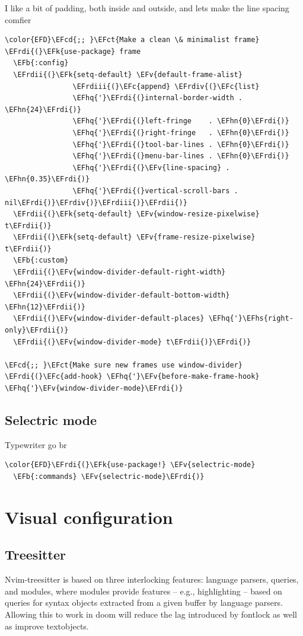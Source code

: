 \documentclass{scrartcl}
\newcommand{\EFk}[1]{\textcolor{EFk}{#1}} %
\newcommand{\EFb}[1]{\textcolor{EFb}{#1}} %
\newcommand{\EFct}[1]{\textcolor{EFct}{#1}} %
\newcommand{\EFc}[1]{\textcolor{EFc}{#1}} %
\newcommand{\EFv}[1]{\textcolor{EFv}{#1}} %
\newcommand{\EFcd}[1]{\textcolor{EFcd}{#1}} %
\newcommand{\EFhn}[1]{#1} %
\newcommand{\EFhq}[1]{#1} %
\newcommand{\EFhs}[1]{#1} %
\newcommand{\EFrdi}[1]{#1} %
\newcommand{\EFrdii}[1]{#1} %
\newcommand{\EFrdiii}[1]{#1} %
\newcommand{\EFrdiv}[1]{#1} %
\begin{document}
I like a bit of padding, both inside and outside, and lets make the line spacing comfier
\begin{Code}
\begin{Verbatim}[]
\color{EFD}\EFcd{;; }\EFct{Make a clean \& minimalist frame}
\EFrdi{(}\EFk{use-package} frame
  \EFb{:config}
  \EFrdii{(}\EFk{setq-default} \EFv{default-frame-alist}
                \EFrdiii{(}\EFc{append} \EFrdiv{(}\EFc{list}
                \EFhq{'}\EFrdi{(}internal-border-width . \EFhn{24}\EFrdi{)}
                \EFhq{'}\EFrdi{(}left-fringe    . \EFhn{0}\EFrdi{)}
                \EFhq{'}\EFrdi{(}right-fringe   . \EFhn{0}\EFrdi{)}
                \EFhq{'}\EFrdi{(}tool-bar-lines . \EFhn{0}\EFrdi{)}
                \EFhq{'}\EFrdi{(}menu-bar-lines . \EFhn{0}\EFrdi{)}
                \EFhq{'}\EFrdi{(}\EFv{line-spacing} . \EFhn{0.35}\EFrdi{)}
                \EFhq{'}\EFrdi{(}vertical-scroll-bars . nil\EFrdi{)}\EFrdiv{)}\EFrdiii{)}\EFrdii{)}
  \EFrdii{(}\EFk{setq-default} \EFv{window-resize-pixelwise} t\EFrdii{)}
  \EFrdii{(}\EFk{setq-default} \EFv{frame-resize-pixelwise} t\EFrdii{)}
  \EFb{:custom}
  \EFrdii{(}\EFv{window-divider-default-right-width} \EFhn{24}\EFrdii{)}
  \EFrdii{(}\EFv{window-divider-default-bottom-width} \EFhn{12}\EFrdii{)}
  \EFrdii{(}\EFv{window-divider-default-places} \EFhq{'}\EFhs{right-only}\EFrdii{)}
  \EFrdii{(}\EFv{window-divider-mode} t\EFrdii{)}\EFrdi{)}

\EFcd{;; }\EFct{Make sure new frames use window-divider}
\EFrdi{(}\EFc{add-hook} \EFhq{'}\EFv{before-make-frame-hook} \EFhq{'}\EFv{window-divider-mode}\EFrdi{)}
\end{Verbatim}
\end{Code}

\subsection{Selectric mode}
\label{sec:org7f22d3d}
Typewriter go br
\begin{Code}
\begin{Verbatim}[]
\color{EFD}\EFrdi{(}\EFk{use-package!} \EFv{selectric-mode}
  \EFb{:commands} \EFv{selectric-mode}\EFrdi{)}
\end{Verbatim}
\end{Code}

\section{Visual configuration}
\label{sec:org683c6fa}
\subsection{Treesitter}
\label{sec:org1a7d59b}
Nvim-treesitter is based on three interlocking features: language parsers, queries, and modules, where modules provide features – e.g., highlighting – based on queries for syntax objects extracted from a given buffer by language parsers. Allowing this to work in doom will reduce the lag introduced by fontlock as well as improve textobjects.
\end{document}
